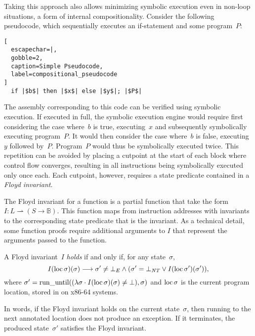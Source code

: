 Taking this approach also allows minimizing symbolic execution
even in non-loop situations, a form of internal compositionality.
Consider the following pseudocode,
which sequentially executes an if-statement and some program~$P$:
\begin{lstlisting}[
  escapechar=|,
  gobble=2,
  caption=Simple Pseudocode,
  label=compositional_pseudocode
]
  if |$b$| then |$x$| else |$y$|; |$P$|
\end{lstlisting}
The assembly corresponding to this code can be verified using symbolic execution.
If executed in full, the symbolic execution engine
would require first considering the case where~$b$ is true,
executing~$x$ and subsequently symbolically executing program~$P$.
It would then consider the case where~$b$ is false, executing~$y$ followed by~$P$.
Program~$P$ would thus be symbolically executed twice.
This repetition can be avoided
by placing a cutpoint at the start of each block where control flow converges,
resulting in all instructions being symbolically executed only once each.
Each cutpoint, however, requires a state predicate contained
in a \emph{Floyd invariant}.

The Floyd invariant for a function is a partial function
that take the form $I:L\rightharpoonup(S\rightarrow\mathbb{B})$.%
%
This function maps from instruction addresses with invariants
to the corresponding state predicate that is the invariant.
As a technical detail, some function proofs require additional arguments to $I$
that represent the arguments passed to the function.
\begin{definition}\label{def:floyd_inv}
  A Floyd invariant~$I$ \emph{holds} if and only if, for any state~$\sigma$,
  \begin{equation}
    I(\operatorname{loc}\sigma)(\sigma)\longrightarrow
    \sigma'\neq\bot_E\wedge(\sigma'=\bot_{\mathit{NT}}\vee I(\operatorname{loc}\sigma')(\sigma')),
  \end{equation}
  where
  $\sigma'=\operatorname{run\_until}((\lambda\sigma\cdot I(\operatorname{loc}\sigma)(\sigma)\neq\bot),\sigma)$%
  and $\operatorname{loc}\sigma$ is the current program location,
  stored in  on x86-64 systems.
\end{definition}
In words, if the Floyd invariant holds on the current state~$\sigma$,
then running to the next annotated location does not produce an exception.
If it terminates, the produced state~$\sigma'$ satisfies the Floyd invariant.


